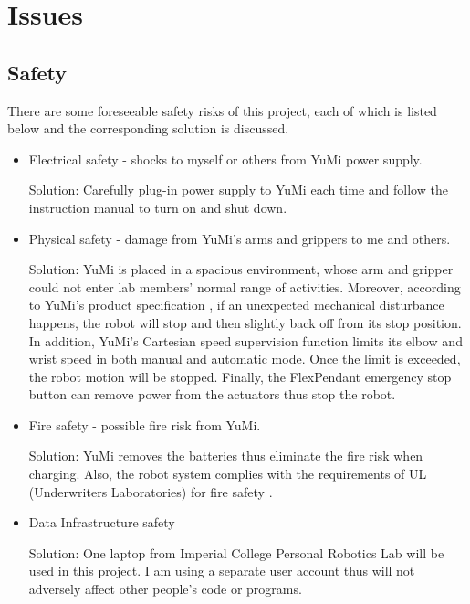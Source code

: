 \chapter{Issues}

\section{Safety}
There are some foreseeable safety risks of this project, each of which is listed below and the corresponding solution is discussed. 

\begin{itemize}
 \item Electrical safety - shocks to myself or others from YuMi power supply.

Solution: Carefully plug-in power supply to YuMi each time and follow the instruction manual to turn on and shut down. 

 \item Physical safety - damage from YuMi's arms and grippers to me and others.
 
Solution: YuMi is placed in a spacious environment, whose arm and gripper could not enter lab members' normal range of activities. Moreover, according to YuMi's product specification \citep{Productspecification}, if an unexpected mechanical disturbance happens, the robot will stop and then slightly back off from its stop position. In addition, YuMi's Cartesian speed supervision function limits its elbow and wrist speed in both manual and automatic mode. Once the limit is exceeded, the robot motion will be stopped. Finally, the FlexPendant emergency stop button can remove power from the actuators thus stop the robot. 
 
 \item Fire safety - possible fire risk from YuMi.

Solution: YuMi removes the batteries thus eliminate the fire risk when charging. Also, the robot system complies with the requirements of UL (Underwriters Laboratories) for fire safety \citep{Productspecification}.

 \item Data Infrastructure safety
 
Solution: One laptop from Imperial College Personal Robotics Lab will be used in this project. I am using a separate user account thus will not adversely affect other people's code or programs.
 
\end{itemize}

